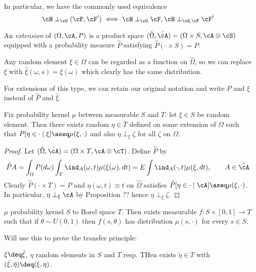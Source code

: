 In particular, we have the commonly used equivalence
\[
  \cH \perp_{\cG} (\cF, \cF') \iff \cH \perp_{\cG} \cF, \cH \perp_{\cG, \cF} \cF'
\]

\begin{definition}
  An \emph{extension} of $(\Omega, \cA, P)$ is a product space
  $(\hat{\Omega}, \hat{\cA}) = (\Omega \times S, \cA \otimes \cS)$
  equipped with a probability measure $\hat{P}$ satisfying
  $\hat{P}(\cdot \times S) = P$.
\end{definition}

Any random element $\xi \in \Omega$ can be regarded as a function on
$\hat\Omega$, so we can replace $\xi$ with $\hat\xi(\omega,s) = \xi(\omega)$
which clearly has the same distribution.

For extensions of this type, we can retain our original notation
and write $P$ and $\xi$ instead of $\hat{P}$ and $\hat\xi$.

\begin{lemma}[Extension]
  Fix probability kernel $\mu$ between measurable $S$ and $T$.
  let $\xi \in S$ be random element.
  Then there exists random $\eta \in T$ defined on some extension of
  $\Omega$ such that
  $P[\eta \in \cdot \mid \xi] \aseq \mu(\xi, \cdot)$
  and also $\eta \perp_\xi \zeta$ for all $\zeta$ on $\Omega$.
\end{lemma}

\begin{proof}
  Let $(\hat\Omega, \hat\cA) = (\Omega \times T, \cA \otimes \cT)$.
  Define $\hat{P}$ by
  \[
    \hat{P} A
    = \int_\Omega P(d\omega) \int_T \ind_A(\omega, t) \mu(\xi(\omega), dt)
    = E \int \ind_A(\cdot, t) \mu(\xi, dt), \qquad A \in \hat\cA
  \]
  Clearly $\hat{P}(\cdot \times T) = P$ and $\eta(\omega, t) \equiv t$
  on $\hat\Omega$ satisfies
  $\hat{P}[\eta \in \cdot \mid \cA] \aseq \mu(\xi, \cdot)$.
  In particular, $\eta \perp_\xi \cA$ by
  Proposition ?? hence $\eta \perp_\xi \zeta$.
\end{proof}

\begin{lemma}
  $\mu$ probability kernel $S$ to Borel space $T$.
  Then exists measurable $f : S \times [0,1] \to T$ such that
  if $\theta \sim U(0,1)$ then
  $f(s,\theta)$ has distribution $\mu(s,\cdot)$ for every $s \in S$.
\end{lemma}

Will use this to prove the transfer principle:

\begin{theorem}
  $\xi \deq \tilde{\xi}$, $\eta$ random elements in $S$ and $T$ resp.
  THen exists $\tilde{\eta} \in T$ with
  $(\tilde\xi, \tilde{\eta}) \deq (\xi,\eta)$.
\end{theorem}
